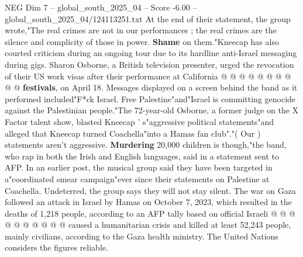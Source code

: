 \begin{textsample}{NEG Dim 7 – global\_south\_2025\_04 – Score -6.00 – global\_south\_2025\_04/124113251.txt}
At the end of their statement, the group wrote,"The real crimes are not in our performances ; the real crimes are the silence and complicity of those in power. \textbf{Shame} on them."Kneecap has also courted criticism during an ongoing tour due to its hardline anti-Israel messaging during gigs.
Sharon Osborne, a British television presenter, urged the revocation of their US work visas after their performance at California @ @ @ @ @ @ @ @ @ @ \textbf{festivals}, on April 18.
Messages displayed on a screen behind the band as it performed included"F*ck Israel.
Free Palestine"and"Israel is committing genocide against the Palestinian people."The 72-year-old Osborne, a former judge on the X Factor talent show, blasted Kneecap ' s"aggressive political statements"and alleged that Kneecap turned Coachella"into a Hamas fan club"."( Our ) statements aren't aggressive. \textbf{Murdering} 20,000 children is though,"the band, who rap in both the Irish and English languages, said in a statement sent to AFP.
In an earlier post, the musical group said they have been targeted in a"coordinated smear campaign"ever since their statements on Palestine at Coachella.
Undeterred, the group says they will not stay silent.
The war on Gaza followed an attack in Israel by Hamas on October 7, 2023, which resulted in the deaths of 1,218 people, according to an AFP tally based on official Israeli @ @ @ @ @ @ @ @ @ @ caused a humanitarian crisis and killed at least 52,243 people, mainly civilians, according to the Gaza health ministry.
The United Nations considers the figures reliable.

\end{textsample}
